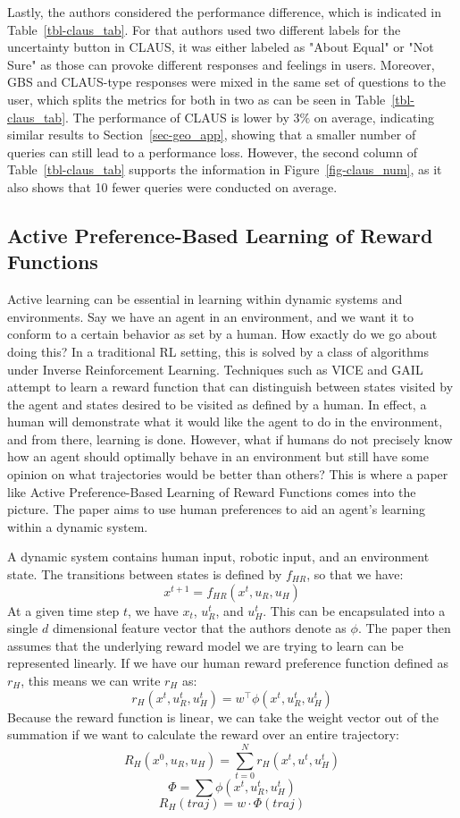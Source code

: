 \documentclass[
  letterpaper,
  numbers=noenddot,
  DIV=11,
  oneside]{scrreprt}
\theoremstyle{remark}
\begin{document}
Lastly, the authors considered the performance difference, which is
indicated in Table~\ref{tbl-claus_tab}. For that authors used two
different labels for the uncertainty button in CLAUS, it was either
labeled as "About Equal" or "Not Sure" as those can provoke different
responses and feelings in users. Moreover, GBS and CLAUS-type responses
were mixed in the same set of questions to the user, which splits the
metrics for both in two as can be seen in Table~\ref{tbl-claus_tab}. The
performance of CLAUS is lower by \(3\%\) on average, indicating similar
results to Section~\ref{sec-geo_app}, showing that a smaller number of
queries can still lead to a performance loss. However, the second column
of Table~\ref{tbl-claus_tab} supports the information in
Figure~\ref{fig-claus_num}, as it also shows that 10 fewer queries were
conducted on average.

\subsection{Active Preference-Based Learning of Reward
Functions}\label{active-preference-based-learning-of-reward-functions}

Active learning can be essential in learning within dynamic systems and
environments. Say we have an agent in an environment, and we want it to
conform to a certain behavior as set by a human. How exactly do we go
about doing this? In a traditional RL setting, this is solved by a class
of algorithms under Inverse Reinforcement Learning. Techniques such as
VICE and GAIL attempt to learn a reward function that can distinguish
between states visited by the agent and states desired to be visited as
defined by a human. In effect, a human will demonstrate what it would
like the agent to do in the environment, and from there, learning is
done. However, what if humans do not precisely know how an agent should
optimally behave in an environment but still have some opinion on what
trajectories would be better than others? This is where a paper like
Active Preference-Based Learning of Reward Functions comes into the
picture. The paper aims to use human preferences to aid an agent's
learning within a dynamic system.

A dynamic system contains human input, robotic input, and an environment
state. The transitions between states is defined by \(f_{HR}\), so that
we have: \[x^{t+1} = f_{HR}(x^t, u_R, u_H)\] At a given time step \(t\),
we have \(x_t\), \(u_R^t\), and \(u_H^t\). This can be encapsulated into
a single \(d\) dimensional feature vector that the authors denote as
\(\phi\). The paper then assumes that the underlying reward model we are
trying to learn can be represented linearly. If we have our human reward
preference function defined as \(r_H\), this means we can write \(r_H\)
as: \[r_H(x^t, u_R^t, u_H^t) = w^{\intercal}\phi(x^t, u_R^t, u_H^t)\]
Because the reward function is linear, we can take the weight vector out
of the summation if we want to calculate the reward over an entire
trajectory:
\[R_{H}(x^0, u_R, u_H) = \sum_{t=0}^{N} r_{H}(x^t, u^t, u_H^t)\]
\[\Phi = \sum \phi(x^t, u_R^t, u_H^t)\] \[R_H(traj) = w\cdot\Phi(traj)\]
\end{document}
